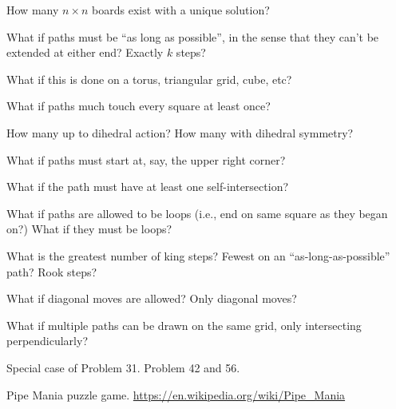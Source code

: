 \documentclass{article}
\begin{document}
\begin{question}
  How many $n \times n$ boards exist with a unique solution?
\end{question}

\begin{related}
  \item What if paths must be ``as long as possible'', in the sense that they
    can't be extended at either end? Exactly $k$ steps?
  \item What if this is done on a torus, triangular grid, cube, etc?
  \item What if paths much touch every square at least once?
  \item How many up to dihedral action? How many with dihedral symmetry?
  \item What if paths must start at, say, the upper right corner?
  \item What if the path must have at least one self-intersection?
  \item What if paths are allowed to be loops (i.e., end on same square as they
    began on?) What if they must be loops?
  \item What is the greatest number of king steps?
    Fewest on an ``as-long-as-possible'' path? Rook steps?
  \item What if diagonal moves are allowed? Only diagonal moves?
  \item What if multiple paths can be drawn on the same grid, only intersecting perpendicularly?
\end{related}

\begin{references}
  \item Special case of Problem 31. Problem 42 and 56.
  \item Pipe Mania puzzle game. \url{https://en.wikipedia.org/wiki/Pipe_Mania}
\end{references}
\end{document}
